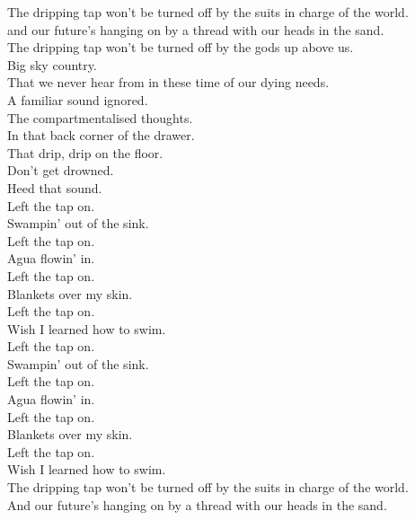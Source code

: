 \label{album:omnium-gatherum}




The dripping tap won't be turned off by the suits in charge of the world. \\
and our future's hanging on by a thread with our heads in the sand. \\
The dripping tap won't be turned off by the gods up above us. \\
Big sky country. \\
That we never hear from in these time of our dying needs. \\

A familiar sound ignored. \\
The compartmentalised thoughts. \\
In that back corner of the drawer. \\
That drip, drip on the floor. \\

Don't get drowned. \\
Heed that sound. \\

Left the tap on. \\
Swampin' out of the sink. \\
Left the tap on. \\
Agua flowin' in. \\
Left the tap on. \\
Blankets over my skin. \\
Left the tap on. \\
Wish I learned how to swim. \\

Left the tap on. \\
Swampin' out of the sink. \\
Left the tap on. \\
Agua flowin' in. \\
Left the tap on. \\
Blankets over my skin. \\
Left the tap on. \\
Wish I learned how to swim. \\

The dripping tap won't be turned off by the suits in charge of the world. \\
And our future's hanging on by a thread with our heads in the sand. \\

